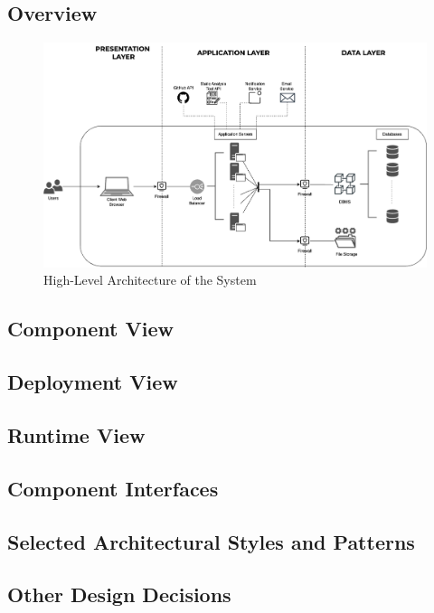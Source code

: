 \subsection{Overview}

\begin{figure}[H]
    \centering
    \includegraphics[width=\linewidth]{Images/hl-architecture.drawio.png}
    \caption{High-Level Architecture of the System}
\end{figure}


\subsection{Component View}




\subsection{Deployment View}






\subsection{Runtime View}




\subsection{Component Interfaces}



\subsection{Selected Architectural Styles and Patterns}




\subsection{Other Design Decisions}


